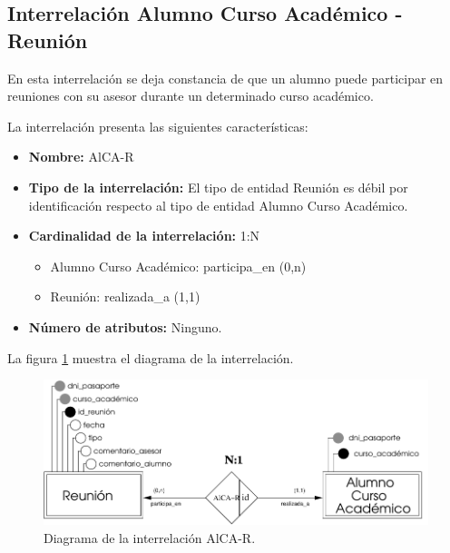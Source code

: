 \subsection{Interrelación Alumno Curso Académico - Reunión}

   \begin{description}
      \item[Definición] En esta interrelación se deja constancia de que un
      alumno puede participar en reuniones con su asesor durante un determinado
      curso académico.

      \item[Características] La interrelación presenta las siguientes
                             características:

         \begin{itemize}
            \item \textbf{Nombre:} AlCA-R
            \item \textbf{Tipo de la interrelación:} El tipo de entidad Reunión
                  es débil por identificación respecto al tipo de entidad Alumno
                  Curso Académico.
            \item \textbf{Cardinalidad de la interrelación:} 1:N
                  \begin{itemize}
                     \item Alumno Curso Académico: participa\_en (0,n)
                     \item Reunión: realizada\_a (1,1)
                  \end{itemize}
            \item \textbf{Número de atributos:} Ninguno.
         \end{itemize}

      \item[Diagrama] La figura \ref{diagramaAlCA-R} muestra el diagrama de la
                      interrelación.

      \item \begin{figure}[!ht]
            \begin{center}
            \includegraphics[]{07.Modelo_Entidad-Interrelacion/7.3.Analisis_Interrelaciones/diagramas/AlCA-R.pdf}
            \caption{Diagrama de la interrelación AlCA-R.}
            \label{diagramaAlCA-R}
            \end{center}
         \end{figure}


\end{description}
